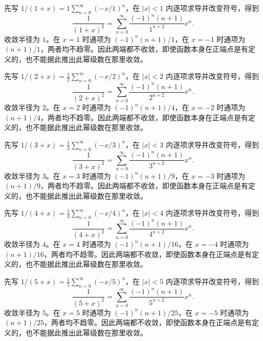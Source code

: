 \documentclass[UTF8,12pt,a4paper,fontset=fandol]{ctexart}
\begin{document}
\begin{solve}\label{ans:c27q19}
先写 $1/(1+x)=1\sum_{n=0}^\infty(-x/1)^n$，在 $|x|<1$ 内逐项求导并改变符号，得到
\[
\frac1{(1+x)^2}=\sum_{n=0}^\infty\frac{(-1)^n(n+1)}{1^{n+2}}x^n.
\]
收敛半径为 $1$。在 $x=1$ 时通项为 $(-1)^n(n+1)/1$，在 $x=-1$ 时通项为 $(n+1)/1$，两者均不趋零。因此两端都不收敛，即使函数本身在正端点是有定义的，也不能据此推出此幂级数在那里收敛。
\end{solve}

\begin{solve}\label{ans:c27q20}
先写 $1/(2+x)=\frac{1}{2}\sum_{n=0}^\infty(-x/2)^n$，在 $|x|<2$ 内逐项求导并改变符号，得到
\[
\frac1{(2+x)^2}=\sum_{n=0}^\infty\frac{(-1)^n(n+1)}{2^{n+2}}x^n.
\]
收敛半径为 $2$。在 $x=2$ 时通项为 $(-1)^n(n+1)/4$，在 $x=-2$ 时通项为 $(n+1)/4$，两者均不趋零。因此两端都不收敛，即使函数本身在正端点是有定义的，也不能据此推出此幂级数在那里收敛。
\end{solve}

\begin{solve}\label{ans:c27q21}
先写 $1/(3+x)=\frac{1}{3}\sum_{n=0}^\infty(-x/3)^n$，在 $|x|<3$ 内逐项求导并改变符号，得到
\[
\frac1{(3+x)^2}=\sum_{n=0}^\infty\frac{(-1)^n(n+1)}{3^{n+2}}x^n.
\]
收敛半径为 $3$。在 $x=3$ 时通项为 $(-1)^n(n+1)/9$，在 $x=-3$ 时通项为 $(n+1)/9$，两者均不趋零。因此两端都不收敛，即使函数本身在正端点是有定义的，也不能据此推出此幂级数在那里收敛。
\end{solve}

\begin{solve}\label{ans:c27q22}
先写 $1/(4+x)=\frac{1}{4}\sum_{n=0}^\infty(-x/4)^n$，在 $|x|<4$ 内逐项求导并改变符号，得到
\[
\frac1{(4+x)^2}=\sum_{n=0}^\infty\frac{(-1)^n(n+1)}{4^{n+2}}x^n.
\]
收敛半径为 $4$。在 $x=4$ 时通项为 $(-1)^n(n+1)/16$，在 $x=-4$ 时通项为 $(n+1)/16$，两者均不趋零。因此两端都不收敛，即使函数本身在正端点是有定义的，也不能据此推出此幂级数在那里收敛。
\end{solve}

\begin{solve}\label{ans:c27q23}
先写 $1/(5+x)=\frac{1}{5}\sum_{n=0}^\infty(-x/5)^n$，在 $|x|<5$ 内逐项求导并改变符号，得到
\[
\frac1{(5+x)^2}=\sum_{n=0}^\infty\frac{(-1)^n(n+1)}{5^{n+2}}x^n.
\]
收敛半径为 $5$。在 $x=5$ 时通项为 $(-1)^n(n+1)/25$，在 $x=-5$ 时通项为 $(n+1)/25$，两者均不趋零。因此两端都不收敛，即使函数本身在正端点是有定义的，也不能据此推出此幂级数在那里收敛。
\end{solve}
\end{document}
